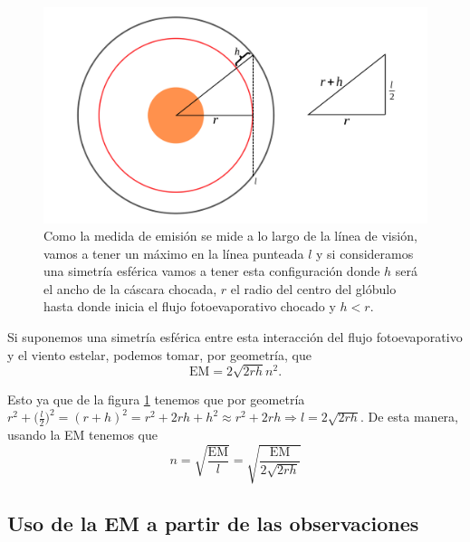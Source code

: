 \documentclass{book}
\begin{document}
\begin{figure}[htb]
    \centering    \includegraphics[width=\textwidth]{artesanales/ImgFi01-4.pdf}
    \caption{Como la medida de emisión se mide a lo largo de la línea de visión, vamos a tener un máximo en la línea punteada $l$ y si consideramos una simetría esférica vamos a tener esta configuración donde $h$ será el ancho de la cáscara chocada, $r$ el radio del centro del glóbulo hasta donde inicia el flujo fotoevaporativo chocado y $h<r$.}
    \label{fig:EM}
\end{figure}

Si suponemos una simetría esférica entre esta interacción del flujo fotoevaporativo y el viento estelar, podemos tomar, por geometría, que
\[\mathrm{EM}=2\sqrt{2rh}n^2.\]


Esto ya que de la figura \ref{fig:EM} tenemos que por geometría $r^2+\Big(\frac{l}{2}\Big)^2=(r+h)^2=r^2+2rh+h^2\approx r^2+2rh\Rightarrow l=2\sqrt{2rh}$. De esta manera, usando la EM tenemos que \[n=\sqrt{\frac{\mathrm{EM}}{l}}=\sqrt{\frac{\mathrm{EM}}{2\sqrt{2rh}}}\] 

\subsection{Uso de la EM a partir de las observaciones} \label{Subsec : EM}
\end{document}
